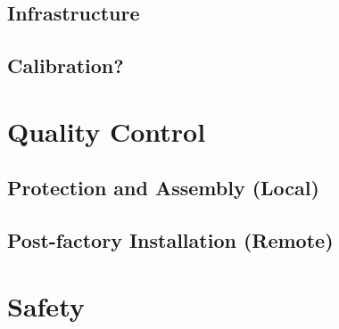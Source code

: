 \subsection{Infrastructure}
\label{sec:fddp-tpc-elec-install-cable}



\subsection{Calibration?}
\label{sec:fddp-tpc-elec-install-calib}



\section{Quality Control}
\label{sec:fddp-tpc-elec-qc}

\subsection{Protection and Assembly (Local)}
\label{sec:fddp-tpc-elec-qc-local}


\subsection{Post-factory Installation (Remote)}
\label{sec:fddp-tpc-elec-qc-remote}





\section{Safety}
\label{sec:fddp-tpc-elec-safety}



